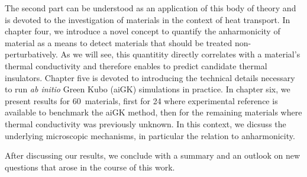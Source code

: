 The second part can be understood as an application of this body of theory and is devoted to the investigation of materials in the context of heat transport. In chapter four, we introduce a novel concept to quantify the anharmonicity of material as a means to detect materials that should be treated non-perturbatively. As we will see, this quantitity directly correlates with a material's thermal conductivity and therefore enables to predict candidate thermal insulators. Chapter five is devoted to introducing the technical details necessary to run \emph{ab initio} Green Kubo (aiGK) simulations in practice. In chapter six, we present results for 60~materials, first for 24 where experimental reference is available to benchmark the aiGK method, then for the remaining materials where thermal conductivity was previously unknown. In this context, we dicsuss the underlying microscopic mechanisms, in particular the relation to anharmonicity.

After discussing our results, we conclude with a summary and an outlook on new questions that arose in the course of this work.
  